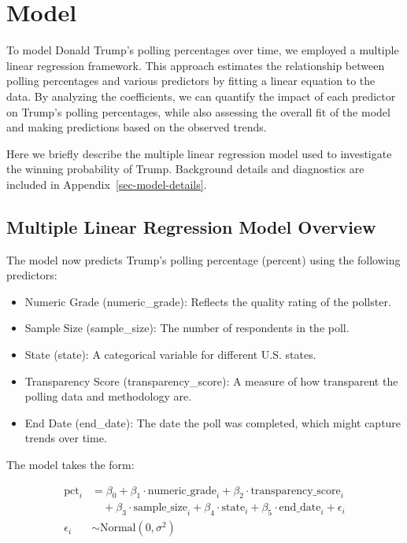 \documentclass[
  letterpaper,
  DIV=11,
  numbers=noendperiod]{scrartcl}
\providecommand{\tightlist}{%
  \setlength{\itemsep}{0pt}\setlength{\parskip}{0pt}}\usepackage{longtable,booktabs,array}
\begin{document}
\section{Model}\label{model}

To model Donald Trump's polling percentages over time, we employed a
multiple linear regression framework. This approach estimates the
relationship between polling percentages and various predictors by
fitting a linear equation to the data. By analyzing the coefficients, we
can quantify the impact of each predictor on Trump's polling
percentages, while also assessing the overall fit of the model and
making predictions based on the observed trends.

Here we briefly describe the multiple linear regression model used to
investigate the winning probability of Trump. Background details and
diagnostics are included in Appendix~\ref{sec-model-details}.

\subsection{Multiple Linear Regression Model
Overview}\label{multiple-linear-regression-model-overview}

The model now predicts Trump's polling percentage (percent) using the
following predictors:

\begin{itemize}
\tightlist
\item
  Numeric Grade (numeric\_grade): Reflects the quality rating of the
  pollster.
\item
  Sample Size (sample\_size): The number of respondents in the poll.
\item
  State (state): A categorical variable for different U.S. states.
\item
  Transparency Score (transparency\_score): A measure of how transparent
  the polling data and methodology are.
\item
  End Date (end\_date): The date the poll was completed, which might
  capture trends over time.
\end{itemize}

The model takes the form:

\begin{align}
\text{pct}_i &= \beta_0 + \beta_1 \cdot \text{numeric\_grade}_i + \beta_2 \cdot \text{transparency\_score}_i \\
             &\quad + \beta_3 \cdot \text{sample\_size}_i + \beta_4 \cdot \text{state}_i + \beta_5 \cdot \text{end\_date}_i + \epsilon_i \\
\epsilon_i &\sim \text{Normal}(0, \sigma^2)
\end{align}
\end{document}
